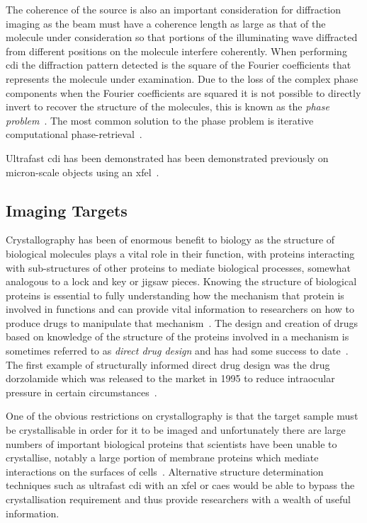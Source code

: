 The coherence of the source is also an important consideration for diffraction imaging as the beam must have a coherence length as large as that of the molecule under consideration so that portions of the illuminating wave diffracted from different positions on the molecule interfere coherently.
When performing \gls{cdi} the diffraction pattern detected is the square of the Fourier coefficients that represents the molecule under examination.
Due to the loss of the complex phase components when the Fourier coefficients are squared it is not possible to directly invert to recover the structure of the molecules, this is known as the \emph{phase problem}~\cite{rodenburg_phase_1989}.
The most common solution to the phase problem is iterative computational phase-retrieval~\cite{chapman_coherent_2010}.

Ultrafast \gls{cdi} has been demonstrated has been demonstrated previously on micron-scale objects using an \gls{xfel}~\cite{chapman_femtosecond_2006}.

\subsection{Imaging Targets}

Crystallography has been of enormous benefit to biology as the structure of biological molecules plays a vital role in their function, with proteins interacting with sub-structures of other proteins to mediate biological processes, somewhat analogous to a lock and key or jigsaw pieces.
Knowing the structure of biological proteins is essential to fully understanding how the mechanism that protein is involved in functions and can provide vital information to researchers on how to produce drugs to manipulate that mechanism~\cite{aloy_structural_2006,almen_mapping_2009}.
The design and creation of drugs based on knowledge of the structure of the proteins involved in a mechanism is sometimes referred to as \emph{direct drug design} and has had some success to date~\cite{klebe_recent_2000,jhoti_structure-based_2007,mauser_recent_2008}.
The first example of structurally informed direct drug design was the drug dorzolamide which was released to the market in 1995 to reduce intraocular pressure in certain circumstances~\cite{greer_application_1994}.

One of the obvious restrictions on crystallography is that the target sample must be crystallisable in order for it to be imaged and unfortunately there are large numbers of important biological proteins that scientists have been unable to crystallise, notably a large portion of membrane proteins which mediate interactions on the surfaces of cells~\cite{geerlof_impact_2006}.
Alternative structure determination techniques such as ultrafast \gls{cdi} with an \gls{xfel} or \gls{caes} would be able to bypass the crystallisation requirement and thus provide researchers with a wealth of useful information.

